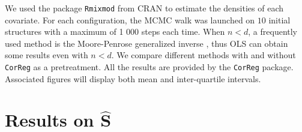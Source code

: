 \documentclass[12pt,a4paper]{report}
\begin{document}
	We used the package { \tt Rmixmod} from CRAN \cite{packageRmixmod} to estimate the densities of each covariate. For each configuration, the MCMC walk was launched on $10$ initial structures with a maximum of 1 000 steps each time.
	When $n<d$, a frequently used method is the Moore-Penrose generalized inverse \cite{katsikis2008fast}, thus OLS can obtain some results even with $n<d$. %
	We compare different methods with and without {\tt CorReg} as a pretreatment. All the results are provided by the {\tt CorReg} package. Associated figures will display both mean and inter-quartile intervals.
	
		\section{Results on $\hat{\boldsymbol{S}}$}	\label{compZ}
\end{document}
